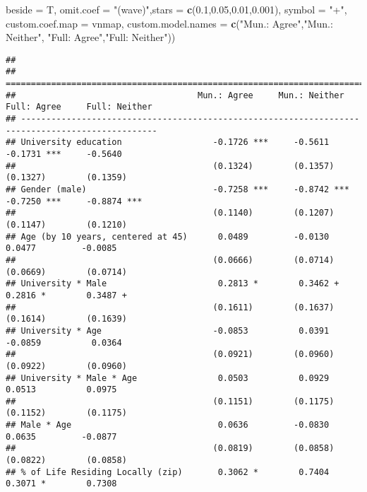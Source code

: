 \documentclass[
]{article}
\newenvironment{Shaded}{\begin{snugshade}}{\end{snugshade}}
\newcommand{\DataTypeTok}[1]{\textcolor[rgb]{0.13,0.29,0.53}{#1}}
\newcommand{\FloatTok}[1]{\textcolor[rgb]{0.00,0.00,0.81}{#1}}
\newcommand{\KeywordTok}[1]{\textcolor[rgb]{0.13,0.29,0.53}{\textbf{#1}}}
\newcommand{\NormalTok}[1]{#1}
\newcommand{\StringTok}[1]{\textcolor[rgb]{0.31,0.60,0.02}{#1}}
\begin{document}
\begin{Shaded}
\begin{Highlighting}[]
          \DataTypeTok{beside =}\NormalTok{ T,}
          \DataTypeTok{omit.coef =} \StringTok{"(wave)"}\NormalTok{,}\DataTypeTok{stars =} \KeywordTok{c}\NormalTok{(}\FloatTok{0.1}\NormalTok{,}\FloatTok{0.05}\NormalTok{,}\FloatTok{0.01}\NormalTok{,}\FloatTok{0.001}\NormalTok{), }\DataTypeTok{symbol =} \StringTok{"+"}\NormalTok{,}
          \DataTypeTok{custom.coef.map =}\NormalTok{ vnmap,}
          \DataTypeTok{custom.model.names =} \KeywordTok{c}\NormalTok{(}\StringTok{"Mun.: Agree"}\NormalTok{,}\StringTok{"Mun.: Neither"}\NormalTok{,}
                                 \StringTok{"Full: Agree"}\NormalTok{,}\StringTok{"Full: Neither"}\NormalTok{))}
\end{Highlighting}
\end{Shaded}

\begin{verbatim}
## 
## =================================================================================================
##                                    Mun.: Agree     Mun.: Neither   Full: Agree     Full: Neither 
## -------------------------------------------------------------------------------------------------
## University education                  -0.1726 ***     -0.5611         -0.1731 ***     -0.5640    
##                                       (0.1324)        (0.1357)        (0.1327)        (0.1359)   
## Gender (male)                         -0.7258 ***     -0.8742 ***     -0.7250 ***     -0.8874 ***
##                                       (0.1140)        (0.1207)        (0.1147)        (0.1210)   
## Age (by 10 years, centered at 45)      0.0489         -0.0130          0.0477         -0.0085    
##                                       (0.0666)        (0.0714)        (0.0669)        (0.0714)   
## University * Male                      0.2813 *        0.3462 +        0.2816 *        0.3487 +  
##                                       (0.1611)        (0.1637)        (0.1614)        (0.1639)   
## University * Age                      -0.0853          0.0391         -0.0859          0.0364    
##                                       (0.0921)        (0.0960)        (0.0922)        (0.0960)   
## University * Male * Age                0.0503          0.0929          0.0513          0.0975    
##                                       (0.1151)        (0.1175)        (0.1152)        (0.1175)   
## Male * Age                             0.0636         -0.0830          0.0635         -0.0877    
##                                       (0.0819)        (0.0858)        (0.0822)        (0.0858)   
## % of Life Residing Locally (zip)       0.3062 *        0.7404          0.3071 *        0.7308    

\end{verbatim}
\end{document}
